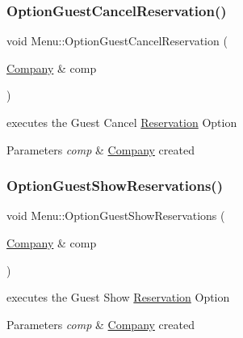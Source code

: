 \subsubsection{\texorpdfstring{Option\+Guest\+Cancel\+Reservation()}{OptionGuestCancelReservation()}}
{\footnotesize\ttfamily void Menu\+::\+Option\+Guest\+Cancel\+Reservation (\begin{DoxyParamCaption}\item[{\hyperlink{class_company}{Company} \&}]{comp }\end{DoxyParamCaption})}



executes the Guest Cancel \hyperlink{class_reservation}{Reservation} Option 


\begin{DoxyParams}{Parameters}
{\em comp} & \hyperlink{class_company}{Company} created \\
\hline
\end{DoxyParams}
\hypertarget{class_menu_ac3538faa6021838efa1d113357a4d057}{}\label{class_menu_ac3538faa6021838efa1d113357a4d057} 
\subsubsection{\texorpdfstring{Option\+Guest\+Show\+Reservations()}{OptionGuestShowReservations()}}
{\footnotesize\ttfamily void Menu\+::\+Option\+Guest\+Show\+Reservations (\begin{DoxyParamCaption}\item[{\hyperlink{class_company}{Company} \&}]{comp }\end{DoxyParamCaption})}



executes the Guest Show \hyperlink{class_reservation}{Reservation} Option 


\begin{DoxyParams}{Parameters}
{\em comp} & \hyperlink{class_company}{Company} created \\
\hline
\end{DoxyParams}
\hypertarget{class_menu_ac87954509d932e68db4b881be7cf4720}{}\label{class_menu_ac87954509d932e68db4b881be7cf4720} 
